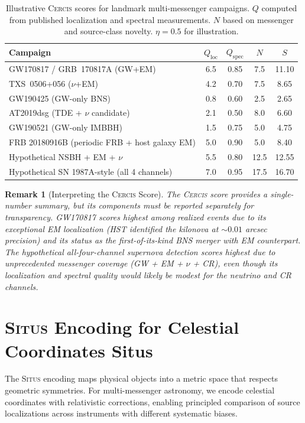 \documentclass[11pt,a4paper]{article}
\newtheorem{remark}[theorem]{Remark}
\theoremstyle{definition}
\newcommand{\Situs}{\textsc{Situs}}
\newcommand{\Cercis}{\textsc{Cercis}}
\begin{document}
\begin{table}[htbp]
\centering
\caption{Illustrative \Cercis{} scores for landmark multi-messenger campaigns. $Q$ computed from published localization and spectral measurements. $N$ based on messenger and source-class novelty. $\eta = 0.5$ for illustration.}
\label{tab:cercis_astro}
\begin{tabular}{lcccc}
\toprule
Campaign & $Q_{\mathrm{loc}}$ & $Q_{\mathrm{spec}}$ & $N$ & $S$ \\
\midrule
GW170817 / GRB~170817A (GW+EM)               & 6.5 & 0.85 & 7.5  & 11.10 \\
TXS~0506+056 ($\nu$+EM)                       & 4.2 & 0.70 & 7.5  & 8.65  \\
GW190425 (GW-only BNS)                        & 0.8 & 0.60 & 2.5  & 2.65  \\
AT2019dsg (TDE + $\nu$ candidate)             & 2.1 & 0.50 & 8.0  & 6.60  \\
GW190521 (GW-only IMBBH)                      & 1.5 & 0.75 & 5.0  & 4.75  \\
FRB 20180916B (periodic FRB + host galaxy EM) & 5.0 & 0.90 & 5.0  & 8.40  \\
Hypothetical NSBH + EM + $\nu$                & 5.5 & 0.80 & 12.5 & 12.55 \\
Hypothetical SN 1987A-style (all 4 channels)  & 7.0 & 0.95 & 17.5 & 16.70 \\
\bottomrule
\end{tabular}
\end{table}
\begin{remark}[Interpreting the \Cercis{} Score]
The \Cercis{} score provides a single-number summary, but its components must be reported separately for transparency. GW170817 scores highest among realized events due to its exceptional EM localization (HST identified the kilonova at $\sim 0.01$ arcsec precision) and its status as the first-of-its-kind BNS merger with EM counterpart. The hypothetical all-four-channel supernova detection scores highest due to unprecedented messenger coverage (GW + EM + $\nu$ + CR), even though its localization and spectral quality would likely be modest for the neutrino and CR channels.
\end{remark}
\section{\Situs{} Encoding for Celestial Coordinates Situs}
\label{sec:situs}
The \Situs{} encoding \cite{SCX2025} maps physical objects into a metric space that respects geometric symmetries. For multi-messenger astronomy, we encode celestial coordinates with relativistic corrections, enabling principled comparison of source localizations across instruments with different systematic biases.
\end{document}
